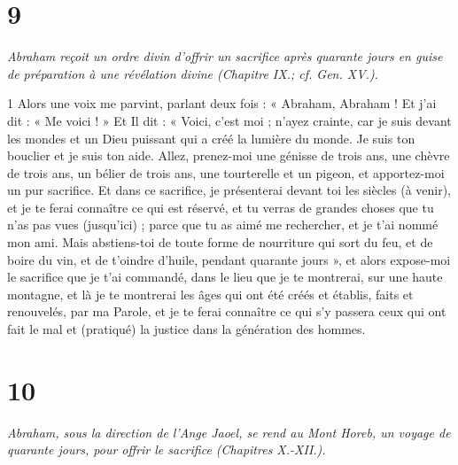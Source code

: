 \chapter{9}

\par \textit{Abraham reçoit un ordre divin d'offrir un sacrifice après quarante jours en guise de préparation à une révélation divine (Chapitre IX.; cf. Gen. XV.).}

\par 1 Alors une voix me parvint, parlant deux fois : « Abraham, Abraham ! Et j’ai dit : « Me voici ! » Et Il dit : « Voici, c’est moi ; n'ayez crainte, car je suis devant les mondes et un Dieu puissant qui a créé la lumière du monde. Je suis ton bouclier et je suis ton aide. Allez, prenez-moi une génisse de trois ans, une chèvre de trois ans, un bélier de trois ans, une tourterelle et un pigeon, et apportez-moi un pur sacrifice. Et dans ce sacrifice, je présenterai devant toi les siècles (à venir), et je te ferai connaître ce qui est réservé, et tu verras de grandes choses que tu n'as pas vues (jusqu'ici) ; parce que tu as aimé me rechercher, et je t'ai nommé mon ami. Mais abstiens-toi de toute forme de nourriture qui sort du feu, et de boire du vin, et de t'oindre d'huile, pendant quarante jours », et alors expose-moi le sacrifice que je t'ai commandé, dans le lieu que je te montrerai, sur une haute montagne, et là je te montrerai les âges qui ont été créés et établis, faits et renouvelés, par ma Parole, et je te ferai connaître ce qui s'y passera ceux qui ont fait le mal et (pratiqué) la justice dans la génération des hommes.

\chapter{10}

\par \textit{Abraham, sous la direction de l'Ange Jaoel, se rend au Mont Horeb, un voyage de quarante jours, pour offrir le sacrifice (Chapitres X.-XII.).}

